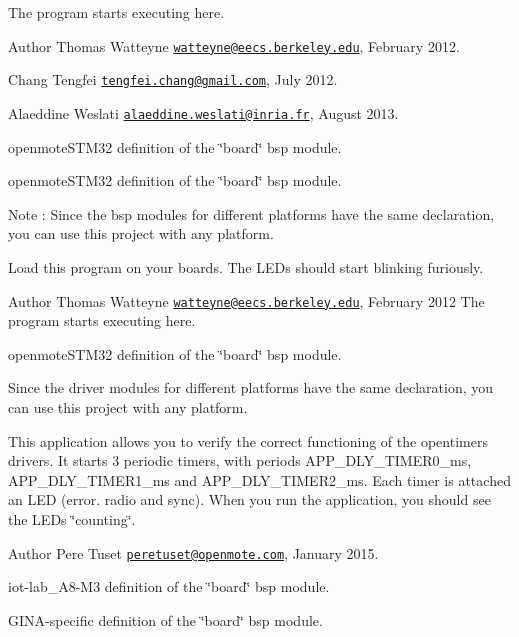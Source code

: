 The program starts executing here.

\begin{DoxyAuthor}{Author}
Thomas Watteyne \href{mailto:watteyne@eecs.berkeley.edu}{\tt watteyne@eecs.\+berkeley.\+edu}, February 2012. 

Chang Tengfei \href{mailto:tengfei.chang@gmail.com}{\tt tengfei.\+chang@gmail.\+com}, July 2012. 

Alaeddine Weslati \href{mailto:alaeddine.weslati@inria.fr}{\tt alaeddine.\+weslati@inria.\+fr}, August 2013.
\end{DoxyAuthor}
openmote\+S\+T\+M32 definition of the \char`\"{}board\char`\"{} bsp module.

openmote\+S\+T\+M32 definition of the \char`\"{}board\char`\"{} bsp module.

\begin{DoxyNote}{Note}
\+: Since the bsp modules for different platforms have the same declaration, you can use this project with any platform.
\end{DoxyNote}
Load this program on your boards. The L\+E\+Ds should start blinking furiously.

\begin{DoxyAuthor}{Author}
Thomas Watteyne \href{mailto:watteyne@eecs.berkeley.edu}{\tt watteyne@eecs.\+berkeley.\+edu}, February 2012 The program starts executing here.
\end{DoxyAuthor}
openmote\+S\+T\+M32 definition of the \char`\"{}board\char`\"{} bsp module.

Since the driver modules for different platforms have the same declaration, you can use this project with any platform.

This application allows you to verify the correct functioning of the opentimers drivers. It starts 3 periodic timers, with periods A\+P\+P\+\_\+\+D\+L\+Y\+\_\+\+T\+I\+M\+E\+R0\+\_\+ms, A\+P\+P\+\_\+\+D\+L\+Y\+\_\+\+T\+I\+M\+E\+R1\+\_\+ms and A\+P\+P\+\_\+\+D\+L\+Y\+\_\+\+T\+I\+M\+E\+R2\+\_\+ms. Each timer is attached an L\+ED (error. radio and sync). When you run the application, you should see the L\+E\+Ds \char`\"{}counting\char`\"{}.

\begin{DoxyAuthor}{Author}
Pere Tuset \href{mailto:peretuset@openmote.com}{\tt peretuset@openmote.\+com}, January 2015.
\end{DoxyAuthor}
iot-\/lab\+\_\+\+A8-\/\+M3 definition of the \char`\"{}board\char`\"{} bsp module.

G\+I\+N\+A-\/specific definition of the \char`\"{}board\char`\"{} bsp module.

